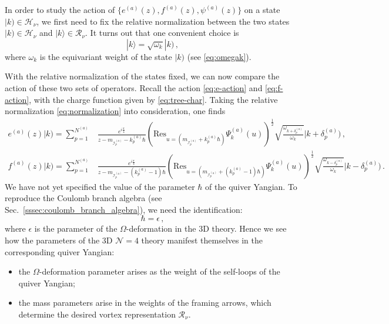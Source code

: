\documentclass[12pt,a4paper]{article}
\renewcommand{\(}{\left(}
\renewcommand{\)}{\right)}
\newcommand{\eps}{\epsilon}
\renewcommand{\(}{\left(}
\renewcommand{\)}{\right)}
\begin{document}
In order to study the action of $\{e^{(a)}(z),f^{(a)}(z),\psi^{(a)}(z)\}$ on a state $|k)\in\mathcal{H}_\nu$, we first need to fix the relative normalization between the two states $|k)\in\mathcal{H}_{\nu}$ and $|k\rangle\in\mathcal{R}_{\nu}$. 
It turns out that one convenient choice is 
\begin{equation}\label{eq:normalization}
|k\rangle=\sqrt{\omega_k}|k)\,,
\end{equation}
where $\omega_k$ is the equivariant weight of the state $|k)$ (see \eqref{eq:omegak}).


With the relative normalization of the states fixed, we can now compare the action of these two sets of operators. 
Recall the action \eqref{eq:e-action} and \eqref{eq:f-action}, with the charge function given by \eqref{eq:tree-char}. 
Taking the relative normalization \eqref{eq:normalization} into consideration, one finds
{\footnotesize
\begin{equation}
    \begin{aligned}
e^{(a)}(z)|k)=\sum_{p=1}^{N^{(a)}}&\frac{e^{i\frac{\pi}{4}}}{z-m_{\mathcal{I}^{(a)}_{p}}-k^{(a)}_p \hbar}\left(\mathrm{Res}_{u=(m_{\mathcal{I}^{(a)}_{p}}+k^{(a)}_{p}\hbar)}\Psi^{(a)}_k(u)\right)^{\frac{1}{2}}\sqrt{\frac{\omega_{k+\delta^{(a)}_{p}}}{\omega_k}}|k+\delta^{(a)}_{p})\,,\\
f^{(a)}(z)|k)=\sum_{p=1}^{N^{(a)}}&\frac{e^{i\frac{\pi}{4}}}{z-m_{\mathcal{I}^{(a)}_{p}}-(k^{(a)}_{p}-1)\hbar}\left(\mathrm{Res}_{u=(m_{\mathcal{I}^{(a)}_{p}}+(k^{(a)}_{p}-1)\hbar)}\Psi^{(a)}_k(u)\right)^{\frac{1}{2}}\sqrt{\frac{\omega_{k-\delta^{(a)}_{p}}}{\omega_k}}|k-\delta^{(a)}_{p})\,.
\end{aligned}
\end{equation}}
We have not yet specified the value of the parameter $\hbar$ of the quiver Yangian. 
To reproduce the Coulomb branch algebra (see Sec.~\ref{sssec:coulomb_branch_algebra}), we need the identification: 
\begin{equation}\label{eq:hbar=eps}
\hbar=\eps\,,
\end{equation}
where $\eps$ is the parameter of the $\Omega$-deformation in the 3D theory. 
Hence we see how the parameters of the 3D $\mathcal{N}=4$ theory manifest themselves in the corresponding quiver Yangian: 
\begin{itemize}
\item the $\Omega$-deformation parameter arises as the weight of the self-loops of the quiver Yangian;
\item the mass parameters arise in the weights of the framing arrows, which determine the desired vortex representation $\mathcal{R}_\nu$.
\end{itemize}
\end{document}
